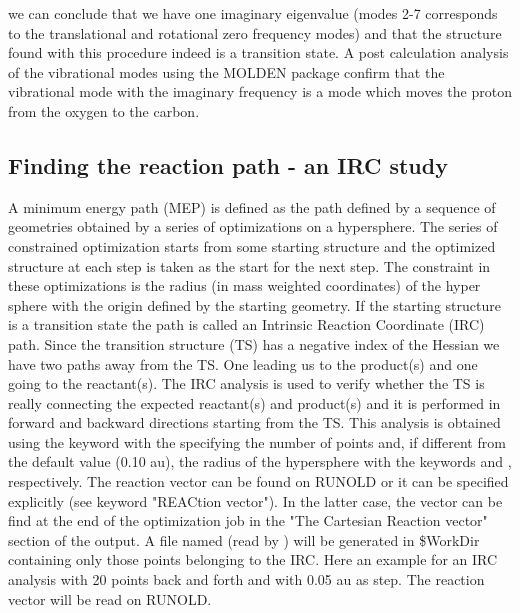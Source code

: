 we can conclude that we have one imaginary eigenvalue (modes 2-7 corresponds to the translational
and rotational zero frequency modes) and that the structure found with this procedure indeed is a
transition state. A post calculation analysis of the vibrational modes using the MOLDEN package
confirm that the vibrational mode with the imaginary frequency is a mode which moves the proton from
the oxygen to the carbon. 


\subsection{Finding the reaction path - an IRC study}

A minimum energy path (MEP) is defined as the path defined by a sequence of geometries obtained by a
series of optimizations on a hypersphere. The series of constrained optimization starts from some
starting structure and the optimized structure at each step is taken as the start for the next step.
The constraint in these optimizations is the radius (in mass weighted coordinates) of the hyper sphere
with the origin defined by the starting geometry. If the starting structure is a transition state the
path is called an Intrinsic Reaction Coordinate (IRC) path. Since the transition structure (TS) has a negative
index of the Hessian we have two paths away from the TS. One leading us to the product(s) and one going to
the reactant(s). The IRC analysis is used to verify whether the TS is really connecting the expected
reactant(s) and product(s) and it is performed in forward and backward directions starting from the TS.
This analysis is obtained using the keyword  with the  
specifying the number of points and, if different from the default value (0.10 au), the radius 
of the hypersphere with the keywords  and , respectively.
The reaction vector can be found on RUNOLD or it can be specified explicitly (see keyword "REACtion vector").
In the latter case, the vector can be find at the end of the optimization job in the 
"The Cartesian Reaction vector" section of the  output.
A file named  (read by  ) will be generated 
in \$WorkDir containing only those points belonging to the IRC.
Here an example for an IRC analysis with 20 points back and forth and with 0.05 au as step. 
The reaction vector will be read on RUNOLD.

